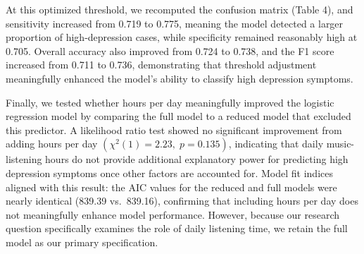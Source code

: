 \documentclass[
  letterpaper,
  DIV=11,
  numbers=noendperiod]{scrartcl}
\begin{document}
At this optimized threshold, we recomputed the confusion matrix (Table
4), and sensitivity increased from 0.719 to 0.775, meaning the model
detected a larger proportion of high-depression cases, while specificity
remained reasonably high at 0.705. Overall accuracy also improved from
0.724 to 0.738, and the F1 score increased from 0.711 to 0.736,
demonstrating that threshold adjustment meaningfully enhanced the
model's ability to classify high depression symptoms.

Finally, we tested whether hours per day meaningfully improved the
logistic regression model by comparing the full model to a reduced model
that excluded this predictor. A likelihood ratio test showed no
significant improvement from adding hours per day
\((\chi^2(1) = 2.23,\; p = 0.135)\), indicating that daily
music-listening hours do not provide additional explanatory power for
predicting high depression symptoms once other factors are accounted
for. Model fit indices aligned with this result: the AIC values for the
reduced and full models were nearly identical (839.39 vs.~839.16),
confirming that including hours per day does not meaningfully enhance
model performance. However, because our research question specifically
examines the role of daily listening time, we retain the full model as
our primary specification.
\end{document}
